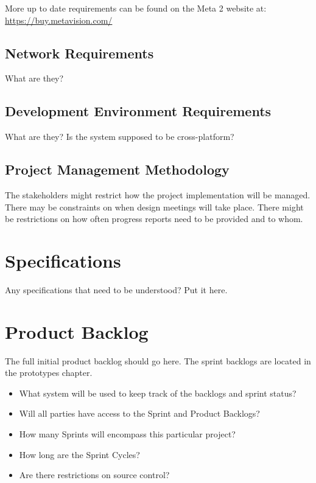 More up to date requirements can be found on the Meta 2 website at: \url{https://buy.metavision.com/}

\subsection{Network Requirements}
What are they? 


\subsection{Development Environment Requirements}
What are they?  Is the system supposed to be cross-platform? 

\subsection{Project  Management Methodology}
The stakeholders might restrict how the project implementation will be managed. 
 There may be constraints on when design meetings will take place.  There might 
be restrictions on how often progress reports need to be provided and to whom. 


\section{Specifications}
Any specifications that need to be understood?  Put it here.  

\section{Product Backlog}
The full initial product backlog should go here.  The sprint backlogs are located in the prototypes chapter.

\begin{itemize}
\item What system will be used to keep track of the backlogs and sprint status?
\item Will all parties have access to the Sprint and Product Backlogs?
\item How many Sprints will encompass this particular project?
\item How long are the Sprint Cycles?
\item Are there restrictions on source control? 
\end{itemize}





